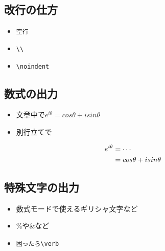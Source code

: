 \documentclass[a4paper, papersize]{jsarticle}
\begin{document}

\subsection{改行の仕方}
\begin{itemize}
\item \verb|空行|
\item \verb|\\|
\item \verb|\noindent|
\end{itemize}


\subsection{数式の出力}
\begin{itemize}
\item 文章中で$e^{i\theta} = cos{\theta} + i sin{\theta}$
\item 別行立てで
\end{itemize}
\begin{align}
e^{i\theta}
&= \cdots
\notag
\\
&= 
cos{\theta} + i sin{\theta}
\label{euler}
\end{align}


\subsection{特殊文字の出力}
\begin{itemize}
\item 数式モードで使えるギリシャ文字など
\item \%や\&など
\item \verb|困ったら\verb|
\end{itemize}

\end{document}
